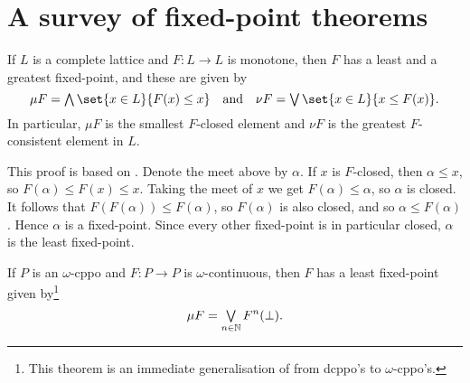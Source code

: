 \documentclass[a4paper, 11pt, article, danish, oneside]{memoir}
\newcommand{\naturals}{\mathbb{N}}
\DeclareMathOperator*{\smallbigvee}{\textstyle\bigvee}
\DeclareMathOperator*{\bigjoin}{\mathchoice
    {\smallbigvee}%
    {\bigvee}%
    {\bigvee}%
    {\bigvee}%
}
\DeclareMathOperator*{\smallbigwedge}{\textstyle\bigwedge}
\DeclareMathOperator*{\bigmeet}{\mathchoice
    {\smallbigwedge}%
    {\bigwedge}%
    {\bigwedge}%
    {\bigwedge}%
}
\begin{document}
\section{A survey of fixed-point theorems}

\begin{theorem}
    If $L$ is a complete lattice and $F \colon L \to L$ is monotone, then $F$ has a least and a greatest fixed-point, and these are given by
    \begin{equation*}
        \mu F
            = \bigmeet \set{x \in L}{F(x) \leq x}
        \quad \text{and} \quad
        \nu F
            = \bigjoin \set{x \in L}{x \leq F(x)}.
    \end{equation*}
    In particular, $\mu F$ is the smallest $F$-closed element and $\nu F$ is the greatest $F$-consistent element in $L$.
\end{theorem}

\begin{prooffootnote}{This proof is based on \textcite[Theorem~2.35]{davey-priestley-order}.}
    Denote the meet above by $\alpha$. If $x$ is $F$-closed, then $\alpha \leq x$, so $F(\alpha) \leq F(x) \leq x$. Taking the meet of $x$ we get $F(\alpha) \leq \alpha$, so $\alpha$ is closed. It follows that $F(F(\alpha)) \leq F(\alpha)$, so $F(\alpha)$ is also closed, and so $\alpha \leq F(\alpha)$. Hence $\alpha$ is a fixed-point. Since every other fixed-point is in particular closed, $\alpha$ is the least fixed-point.
\end{prooffootnote}


\begin{theorem}
    If $P$ is an $\omega$-cppo and $F \colon P \to P$ is $\omega$-continuous, then $F$ has a least fixed-point given by\footnote{This theorem is an immediate generalisation of \textcite[Theorem~8.15]{davey-priestley-order} from dcppo's to $\omega$-cppo's.}
    \begin{equation*}
        \mu F
            = \bigjoin_{n \in \naturals} F^n(\bot).
    \end{equation*}
\end{theorem}
\end{document}
